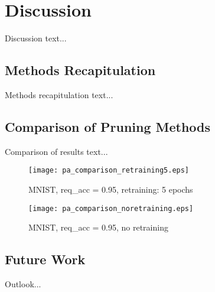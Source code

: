 \chapter{Discussion} \label{chap:discussion}
Discussion text...

\section{Methods Recapitulation} \label{sec:methods_recapitulation}
Methods recapitulation text...

\section{Comparison of Pruning Methods} \label{sec:comparison_of_pruning_methods}
Comparison of results text...

\begin{figure}[H]
\centering
\texttt{[image: pa\_comparison\_retraining5.eps]}
\caption{MNIST, req\_acc = 0.95, retraining: 5 epochs}
\label{fig:discussion:pa_comparison_retraining5}
\end{figure}

\begin{figure}[H]
\centering
\texttt{[image: pa\_comparison\_noretraining.eps]}
\caption{MNIST, req\_acc = 0.95, no retraining}
\label{fig:discussion:pa_comparison_noretraining}
\end{figure}

\section{Future Work} \label{sec:future_work}
Outlook...